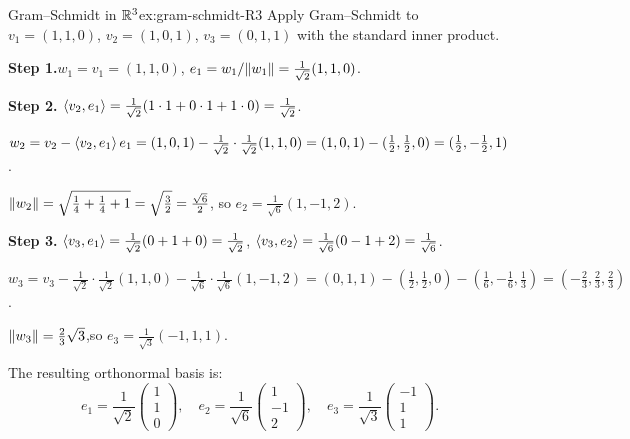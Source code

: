 \begin{example}{Gram--Schmidt in ${\mathbb{R}}^3$}{ex:gram-schmidt-R3}
Apply Gram--Schmidt to $v_1 = (1,1,0)$, $v_2 = (1,0,1)$,
$v_3 = (0,1,1)$ with the standard inner product.

\textbf{Step 1.}\quad $w_1 = v_1 = (1,1,0)$,\quad
$e_1 = w_1/\lVert w_1\rVert = \frac{1}{\sqrt{2}}(1,1,0)$.

\textbf{Step 2.}\quad
$\langle v_2,e_1\rangle = \frac{1}{\sqrt{2}}(1\cdot 1 + 0\cdot 1 + 1\cdot 0)
  = \frac{1}{\sqrt{2}}$.

$w_2 = v_2 - \langle v_2,e_1\rangle\,e_1
  = (1,0,1) - \frac{1}{\sqrt{2}}\cdot\frac{1}{\sqrt{2}}(1,1,0)
  = (1,0,1) - (\tfrac{1}{2},\tfrac{1}{2},0)
  = (\tfrac{1}{2},-\tfrac{1}{2},1)$.

$\lVert w_2\rVert = \sqrt{\tfrac{1}{4}+\tfrac{1}{4}+1}
  = \sqrt{\tfrac{3}{2}} = \frac{\sqrt{6}}{2}$,
\quad so $e_2 = \frac{1}{\sqrt{6}}(1,-1,2)$.

\textbf{Step 3.}\quad
$\langle v_3,e_1\rangle = \frac{1}{\sqrt{2}}(0+1+0) = \frac{1}{\sqrt{2}}$,\quad
$\langle v_3,e_2\rangle = \frac{1}{\sqrt{6}}(0-1+2) = \frac{1}{\sqrt{6}}$.

$w_3 = v_3 - \frac{1}{\sqrt{2}}\cdot\frac{1}{\sqrt{2}}(1,1,0)
  - \frac{1}{\sqrt{6}}\cdot\frac{1}{\sqrt{6}}(1,-1,2)
  = (0,1,1) - (\tfrac{1}{2},\tfrac{1}{2},0) - (\tfrac{1}{6},-\tfrac{1}{6},\tfrac{1}{3})
  = (-\tfrac{2}{3},\tfrac{2}{3},\tfrac{2}{3})$.

$\lVert w_3\rVert = \tfrac{2}{3}\sqrt{3}$,\quad so
$e_3 = \frac{1}{\sqrt{3}}(-1,1,1)$.

\medskip
The resulting orthonormal basis is:
\[
  e_1 = \frac{1}{\sqrt{2}}\begin{pmatrix}1\\1\\0\end{pmatrix},\quad
  e_2 = \frac{1}{\sqrt{6}}\begin{pmatrix}1\\-1\\2\end{pmatrix},\quad
  e_3 = \frac{1}{\sqrt{3}}\begin{pmatrix}-1\\1\\1\end{pmatrix}.
\]
\end{example}

